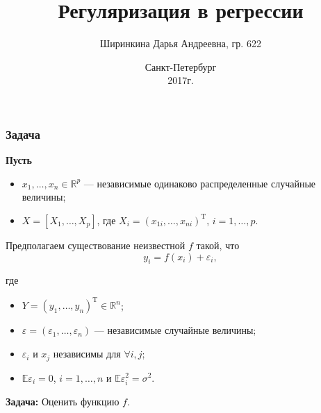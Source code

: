 \documentclass[unicode, notheorems]{beamer}
\title{Регуляризация в регрессии}
\author{Ширинкина Дарья Андреевна, гр. 622}
\institute[СПбГУ]{Санкт-Петербургский государственный университет \\
Математико-механический факультет \\
    Статистическое моделирование
    
    \vspace{0.4cm}
    \vspace{0.3cm}
}
\date{
    Санкт-Петербург\\
    2017г.
}
\newcommand{\R}{\mathbb{R}}
\newcommand{\E}{\mathbb{E}}
\newcommand{\T}{\mathrm{T}}
\begin{document}
\begin{frame}
    \titlepage%
\end{frame}


%
%
%

\begin{frame}
\frametitle{Задача}
\textbf{Пусть}
\begin{itemize}
\item $x_1, \ldots, x_n \in \R^p$ --- независимые одинаково распределенные случайные величины; 
\item $X = [X_1, \ldots, X_p]$, где $X_i = (x_{1i}, \ldots, x_{ni})^{\T}$, $i = 1, \ldots, p$.
\end{itemize}
\vspace{0.5cm}
Предполагаем существование неизвестной $f$ такой, что 
\[y_i = f(x_i) + \varepsilon_i,\]

где 
\begin{itemize}
\item $Y = (y_1, \ldots, y_n)^{\T} \in \R^n$;
\item $\varepsilon = (\varepsilon_1, \ldots, \varepsilon_n)$ --- независимые случайные величины;
\item $\varepsilon_i$ и $x_j$ независимы для $\forall i,j$;
\item $\E\varepsilon_i = 0$, $i = 1, \ldots, n$ и $\E\varepsilon_i^2 = \sigma^2$.
\end{itemize}
\vspace{0.5cm}
\textbf{Задача: } Оценить функцию $f$.
\vspace{0.3cm}

\end{frame}
\end{document}
